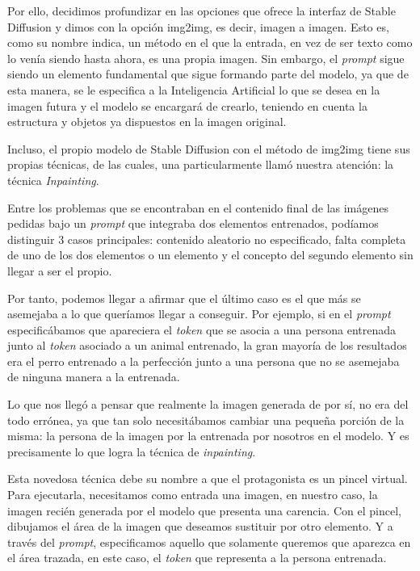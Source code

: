 Por ello, decidimos profundizar en las opciones que ofrece la interfaz de Stable Diffusion y dimos con la opción img2img, es decir, imagen a imagen. Esto es, como su nombre indica, un método en el que la entrada, en vez de ser texto como lo venía siendo hasta ahora, es una propia imagen. Sin embargo, el \textit{prompt} sigue siendo un elemento fundamental que sigue formando parte del modelo, ya que de esta manera, se le especifica a la Inteligencia Artificial lo que se desea en la imagen futura y el modelo se encargará de crearlo, teniendo en cuenta la estructura y objetos ya dispuestos en la imagen original. 

Incluso, el propio modelo de Stable Diffusion con el método de img2img tiene sus propias técnicas, de las cuales, una particularmente llamó nuestra atención: la técnica \textit{Inpainting}. 

Entre los problemas que se encontraban en el contenido final de las imágenes pedidas bajo un \textit{prompt} que integraba dos elementos entrenados, podíamos distinguir 3 casos principales: contenido aleatorio no especificado, falta completa de uno de los dos elementos o un elemento y el concepto del segundo elemento sin llegar a ser el propio. 

Por tanto, podemos llegar a afirmar que el último caso es el que más se asemejaba a lo que queríamos llegar a conseguir. Por ejemplo, si en el \textit{prompt} especificábamos que apareciera el \textit{token} que se asocia a una persona entrenada junto al \textit{token} asociado a un animal entrenado, la gran mayoría de los resultados era el perro entrenado a la perfección junto a una persona que no se asemejaba de ninguna manera a la entrenada.  

Lo que nos llegó a pensar que realmente la imagen generada de por sí, no era del todo errónea, ya que tan solo necesitábamos cambiar una pequeña porción de la misma: la persona de la imagen por la entrenada por nosotros en el modelo. Y es precisamente lo que logra la técnica de \textit{inpainting}. 

Esta novedosa técnica debe su nombre a que el protagonista es un pincel virtual. Para ejecutarla, necesitamos como entrada una imagen, en nuestro caso, la imagen recién generada por el modelo que presenta una carencia. Con el pincel, dibujamos el área de la imagen que deseamos sustituir por otro elemento. Y a través del \textit{prompt}, especificamos aquello que solamente queremos que aparezca en el área trazada, en este caso, el \textit{token} que representa a la persona entrenada. 

